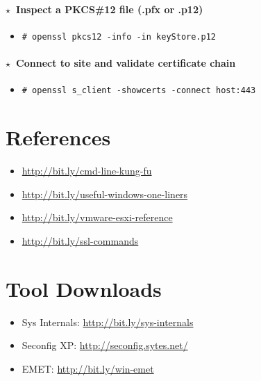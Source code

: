 \documentclass[10pt,landscape]{article}
\newcommand{\os}[1]{\texttt{\footnotesize{#1}}}
\newcommand{\unix}{\os{U}}
\newenvironment{action}[1]
  {\paragraph{$\star$~#1}\begin{itemize}[leftmargin=1cm]}
  {\end{itemize}}
\newcommand{\cmd}[2]{\item[#1] {\small\tt\# #2}}
\begin{document}
\begin{multicols*}{3}
\begin{action}{Inspect a PKCS\#12 file (.pfx or .p12)}
    \cmd{\unix}{openssl pkcs12 -info -in keyStore.p12}
\end{action}

\begin{action}{Connect to site and validate certificate chain}
    \cmd{\unix}{openssl s\_client -showcerts -connect host:443}
\end{action}

\section*{References}

\begin{itemize}
\small
\item \url{http://bit.ly/cmd-line-kung-fu}
\item \url{http://bit.ly/useful-windows-one-liners}
\item \url{http://bit.ly/vmware-esxi-reference}
\item \url{http://bit.ly/ssl-commands}
\end{itemize}

\section*{Tool Downloads}

\begin{itemize}
\small
\item Sys Internals: \url{http://bit.ly/sys-internals}
\item Seconfig XP: \url{http://seconfig.sytes.net/}
\item EMET: \url{http://bit.ly/win-emet}
\end{itemize}
\end{multicols*}
\end{document}
